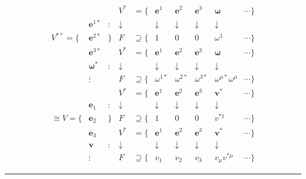 \documentclass[
]{book}
\theoremstyle{definition}
\theoremstyle{definition}
\theoremstyle{definition}
\theoremstyle{definition}
\theoremstyle{remark}
\begin{document}
\[
\begin{array}{cccccccccc}
 &  &  & V^{*} & =\{ & \boldsymbol{e}^{{\scriptscriptstyle 1}} & \boldsymbol{e}^{{\scriptscriptstyle 2}} & \boldsymbol{e}^{{\scriptscriptstyle 3}} & \boldsymbol{\omega} & \cdots\}\\
 & \boldsymbol{e}^{{\scriptscriptstyle 1}*} & : & \downarrow &  & \downarrow & \downarrow & \downarrow & \downarrow\\
V^{**}=\{ & \boldsymbol{e}^{{\scriptscriptstyle 2}*} & \} & F & \supseteq\{ & 1 & 0 & 0 & \omega^{{\scriptscriptstyle 1}} & \cdots\}\\
 & \boldsymbol{e}^{{\scriptscriptstyle 3}*} &  & V^{*} & =\{ & \boldsymbol{e}^{{\scriptscriptstyle 1}} & \boldsymbol{e}^{{\scriptscriptstyle 2}} & \boldsymbol{e}^{{\scriptscriptstyle 3}} & \boldsymbol{\omega} & \cdots\}\\
 & \boldsymbol{\omega}^{*} & : & \downarrow &  & \downarrow & \downarrow & \downarrow & \downarrow\\
 & \vdots &  & F & \supseteq\{ & \omega^{{\scriptscriptstyle 1}*} & \omega^{{\scriptscriptstyle 2}*} & \omega^{{\scriptscriptstyle 3}*} & \omega^{{\scriptscriptstyle \mu}*}\omega^{{\scriptscriptstyle \mu}} & \cdots\}\\
 &  &  & V^{*} & =\{ & \boldsymbol{e}^{{\scriptscriptstyle 1}} & \boldsymbol{e}^{{\scriptscriptstyle 2}} & \boldsymbol{e}^{{\scriptscriptstyle 3}} & \boldsymbol{v}^{*} & \cdots\}\\
 & \boldsymbol{e}_{{\scriptscriptstyle 1}} & : & \downarrow &  & \downarrow & \downarrow & \downarrow & \downarrow\\
\cong V=\{ & \boldsymbol{e}_{{\scriptscriptstyle 2}} & \} & F & \supseteq\{ & 1 & 0 & 0 & v^{*{\scriptscriptstyle 1}} & \cdots\}\\
 & \boldsymbol{e}_{{\scriptscriptstyle 3}} &  & V^{*} & =\{ & \boldsymbol{e}^{{\scriptscriptstyle 1}} & \boldsymbol{e}^{{\scriptscriptstyle 2}} & \boldsymbol{e}^{{\scriptscriptstyle 3}} & \boldsymbol{v}^{*} & \cdots\}\\
 & \boldsymbol{v} & : & \downarrow &  & \downarrow & \downarrow & \downarrow & \downarrow\\
 & \vdots &  & F & \supseteq\{ & v_{{\scriptscriptstyle 1}} & v_{{\scriptscriptstyle 2}} & v_{{\scriptscriptstyle 3}} & v_{{\scriptscriptstyle \mu}}v^{*{\scriptscriptstyle \mu}} & \cdots\}
\end{array}
\]

\begin{center}\rule{0.5\linewidth}{0.5pt}\end{center}
\end{document}
